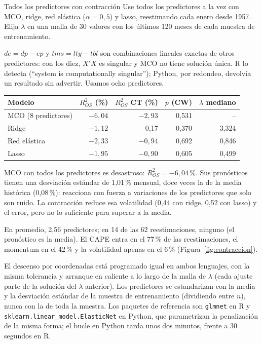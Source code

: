 \begin{ejresuelto}{Todos los predictores con contracción}\label{ej:contraccion}
\enunciado Use todos los predictores a la vez con MCO, ridge, red elástica ($\alpha=0{,}5$) y lasso, reestimando cada enero desde 1957. Elija
$\lambda$ en una malla de 30 valores con los últimos 120 meses de cada muestra de entrenamiento.

\solucion
{} $de=dp-ep$ y $tms=lty-tbl$ son combinaciones lineales exactas de otros predictores: con los diez,
$X'X$ es singular y MCO no tiene solución única. R lo detecta (``system is computationally singular''); Python, por redondeo, devolvía
un resultado sin advertir. Usamos ocho predictores.

\begin{center}\small
\begin{tabular}{@{}lrrrr@{}}
\toprule
Modelo & $R^2_{OS}$ (\%) & $R^2_{OS}$ CT (\%) & $p$ (CW) & $\lambda$ mediano \\
\midrule
MCO (8 predictores) & $-6{,}04$ & $-2{,}93$ & 0,531 & -- \\
Ridge & $-1{,}12$ & 0,17 & 0,370 & 3,324 \\
Red elástica & $-2{,}33$ & $-0{,}94$ & 0,692 & 0,846 \\
Lasso & $-1{,}95$ & $-0{,}90$ & 0,605 & 0,499 \\
\bottomrule
\end{tabular}
\end{center}
MCO con todos los predictores es desastroso: $R^2_{OS}=-6{,}04$\,\%. Sus pronósticos tienen una desviación estándar de 1,01\,\% mensual, doce
veces la de la media histórica (0,08\,\%): reacciona con fuerza a variaciones de los predictores que solo son ruido. La contracción
reduce esa volatilidad (0,44 con ridge, 0,52 con lasso) y el error, pero no lo suficiente para superar a la media.

 En promedio, 2,56 predictores; en 14 de las 62 reestimaciones, ninguno (el pronóstico es la
media). El CAPE entra en el 77\,\% de las reestimaciones, el momentum en el 42\,\% y la volatilidad apenas en el 6\,\% (Figura~\ref{fig:contraccion}).


\RvsPy El descenso por coordenadas está programado igual en ambos lenguajes, con la misma tolerancia y arranque en caliente a lo largo
de la malla de $\lambda$ (cada ajuste parte de la solución del $\lambda$ anterior). Los predictores se estandarizan con la media y la
desviación estándar de la muestra de entrenamiento (dividiendo entre $n$), nunca con la de toda la muestra. Los paquetes de referencia son
\texttt{glmnet} en R y \texttt{sklearn.linear\_model.ElasticNet} en Python, que parametrizan la penalización de la misma forma; el bucle en
Python tarda unos dos minutos, frente a 30 segundos en R.


\end{ejresuelto}
